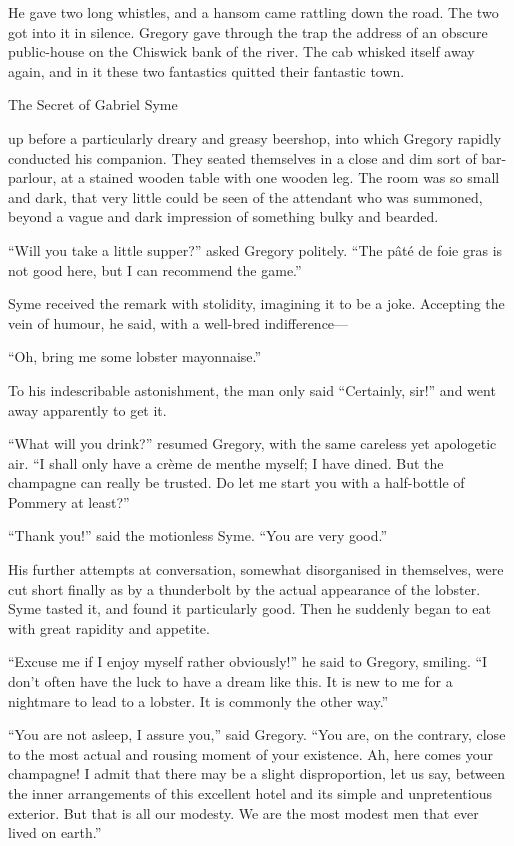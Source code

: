 He gave two long whistles, and a hansom came rattling down the road. The two got into it in silence. Gregory gave through the trap the address of an obscure public-house on the Chiswick bank of the river. The cab whisked itself away again, and in it these two fantastics quitted their fantastic town.

\chap The Secret of Gabriel Syme

 up before a particularly dreary and greasy beershop, into which Gregory rapidly conducted his companion. They seated themselves in a close and dim sort of bar-parlour, at a stained wooden table with one wooden leg. The room was so small and dark, that very little could be seen of the attendant who was summoned, beyond a vague and dark impression of something bulky and bearded.

“Will you take a little supper?” asked Gregory politely. “The pâté de foie gras is not good here, but I can recommend the game.”

Syme received the remark with stolidity, imagining it to be a joke. Accepting the vein of humour, he said, with a well-bred indifference⁠—

“Oh, bring me some lobster mayonnaise.”

To his indescribable astonishment, the man only said “Certainly, sir!” and went away apparently to get it.

“What will you drink?” resumed Gregory, with the same careless yet apologetic air. “I shall only have a crème de menthe myself; I have dined. But the champagne can really be trusted. Do let me start you with a half-bottle of Pommery at least?”

“Thank you!” said the motionless Syme. “You are very good.”

His further attempts at conversation, somewhat disorganised in themselves, were cut short finally as by a thunderbolt by the actual appearance of the lobster. Syme tasted it, and found it particularly good. Then he suddenly began to eat with great rapidity and appetite.

“Excuse me if I enjoy myself rather obviously!” he said to Gregory, smiling. “I don’t often have the luck to have a dream like this. It is new to me for a nightmare to lead to a lobster. It is commonly the other way.”

“You are not asleep, I assure you,” said Gregory. “You are, on the contrary, close to the most actual and rousing moment of your existence. Ah, here comes your champagne! I admit that there may be a slight disproportion, let us say, between the inner arrangements of this excellent hotel and its simple and unpretentious exterior. But that is all our modesty. We are the most modest men that ever lived on earth.”

